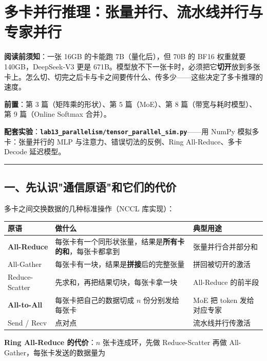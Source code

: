 \chapter{多卡并行推理：张量并行、流水线并行与专家并行}

\begin{noteBox}[核心导读与背景]
\textbf{阅读前须知}：一张 16GB 的卡能跑 7B（量化后），但 70B 的 BF16 权重就要 140GB，DeepSeek-V3 更是 671B。模型放不下一张卡时，必须把它\textbf{切开}放到多张卡上。怎么切、切完之后卡与卡之间要传什么、传多少——这些决定了多卡推理的速度。

\textbf{前置}：第 3 篇（矩阵乘的形状）、第 5 篇（MoE）、第 8 篇（带宽与耗时模型）、第 9 篇（Online Softmax 合并）。

\textbf{配套实验}：\textbf{\texttt{lab13\_parallelism/tensor\_parallel\_sim.py}}——用 NumPy 模拟多卡：张量并行的 MLP 与注意力、错误切法的反例、Ring All-Reduce、多卡 Decode 延迟模型。
\end{noteBox}

\vspace{0.8em}\hrule\vspace{0.8em}

\section{一、先认识"通信原语"和它们的代价}

多卡之间交换数据的几种标准操作（NCCL 库实现）：

\begin{center}
\small
\begin{tabularx}{\textwidth}{p{3cm} p{4.5cm} X}
\toprule
\textbf{原语} & \textbf{做什么} & \textbf{典型用途} \\
\midrule
\textbf{All-Reduce} & 每张卡有一个同形状张量，结果是\textbf{所有卡的和}，每张卡都拿到 & 张量并行合并部分和 \\
All-Gather & 每张卡有一块，结果是\textbf{拼接}后的完整张量 & 拼回被切开的激活 \\
Reduce-Scatter & 先求和，再把结果切块，每张卡拿一块 & All-Reduce 的前半段 \\
\textbf{All-to-All} & 每张卡把自己的数据切成 $n$ 份分别发给每张卡 & MoE 把 token 发给对应专家 \\
Send / Recv & 点对点 & 流水线并行传激活 \\
\bottomrule
\end{tabularx}
\end{center}

\textbf{Ring All-Reduce 的代价}：$n$ 张卡连成环，先做 Reduce-Scatter 再做 All-Gather，每张卡发送的数据量为


